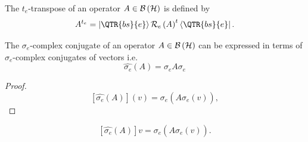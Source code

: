 \begin{definition}
The $t_{e}$-transpose of an operator $A\in {\cal B}\left( {\cal H}\right) $
is defined by 
\begin{equation}
A^{t_{e}}=\left\vert \QTR{bs}{e}\right\rangle {\cal R}_{e}\left( A\right)
^{t}\left\langle \QTR{bs}{e}\right\vert .
\end{equation}
\end{definition}

\begin{lemma}
The $\sigma _{e}$-complex conjugate of an operator $A\in {\cal B}\left( 
{\cal H}\right) $ can be expressed in terms of $\sigma _{e}$-complex
conjugates of vectors i.e. 
\begin{equation}
\widehat{\sigma _{e}}\left( A\right) =\sigma _{e}A\sigma _{e}
\end{equation}

\begin{proof}
\begin{equation}
\left[ \widehat{\sigma _{e}}\left( A\right) \right] \left( v\right) =\sigma
_{e}\left( \stackrel{}{A\sigma _{e}\left( \stackrel{}{v}\right) }\right) ,
\end{equation}
\end{proof}%
\begin{equation}
\left[ \widehat{\sigma _{e}}\left( A\right) \right] v=\sigma _{e}\left( 
\stackrel{}{A\sigma _{e}\left( \stackrel{}{v}\right) }\right) .
\end{equation}
\end{lemma}

